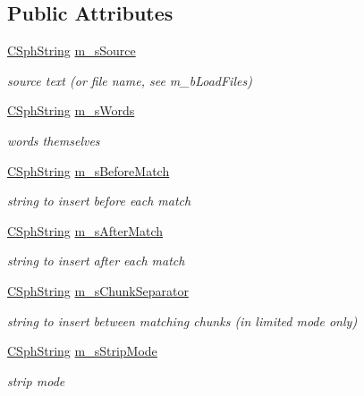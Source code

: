 \subsection*{Public Attributes}
\begin{DoxyCompactItemize}
\item 
\hyperlink{structCSphString}{C\-Sph\-String} \hyperlink{structExcerptQuery__t_a6d492e02492f9d8f09dc3d0adbae4b08}{m\-\_\-s\-Source}
\begin{DoxyCompactList}\small\item\em source text (or file name, see m\-\_\-b\-Load\-Files) \end{DoxyCompactList}\item 
\hyperlink{structCSphString}{C\-Sph\-String} \hyperlink{structExcerptQuery__t_a11cdc32d46f830e774504ac77717d24f}{m\-\_\-s\-Words}
\begin{DoxyCompactList}\small\item\em words themselves \end{DoxyCompactList}\item 
\hyperlink{structCSphString}{C\-Sph\-String} \hyperlink{structExcerptQuery__t_a0269769edc0bf2472707da975c00dffa}{m\-\_\-s\-Before\-Match}
\begin{DoxyCompactList}\small\item\em string to insert before each match \end{DoxyCompactList}\item 
\hyperlink{structCSphString}{C\-Sph\-String} \hyperlink{structExcerptQuery__t_a518c251f53cfd982db1514fb6a978b26}{m\-\_\-s\-After\-Match}
\begin{DoxyCompactList}\small\item\em string to insert after each match \end{DoxyCompactList}\item 
\hyperlink{structCSphString}{C\-Sph\-String} \hyperlink{structExcerptQuery__t_a7657a8fa010638bc269092caecd00fa5}{m\-\_\-s\-Chunk\-Separator}
\begin{DoxyCompactList}\small\item\em string to insert between matching chunks (in limited mode only) \end{DoxyCompactList}\item 
\hyperlink{structCSphString}{C\-Sph\-String} \hyperlink{structExcerptQuery__t_a7c99c5ca909e6092a9ccdd9409c38f46}{m\-\_\-s\-Strip\-Mode}
\begin{DoxyCompactList}\small\item\em strip mode \end{DoxyCompactList}\item 

\end{DoxyCompactItemize}
